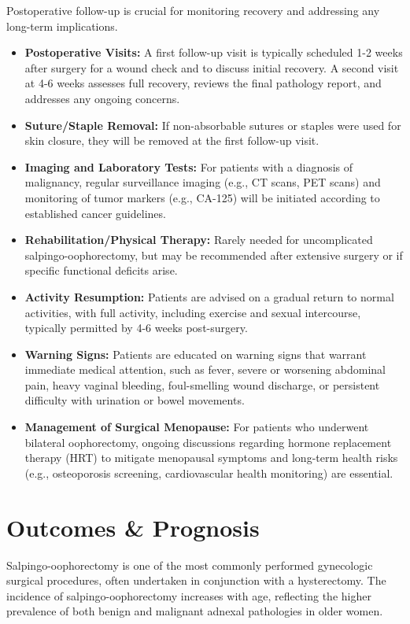 Postoperative follow-up is crucial for monitoring recovery and addressing any long-term implications. 

\begin{itemize}
  \item \textbf{Postoperative Visits:} A first follow-up visit is typically scheduled 1-2 weeks after surgery for a wound check and to discuss initial recovery. A second visit at 4-6 weeks assesses full recovery, reviews the final pathology report, and addresses any ongoing concerns.
  \item \textbf{Suture/Staple Removal:} If non-absorbable sutures or staples were used for skin closure, they will be removed at the first follow-up visit.
  \item \textbf{Imaging and Laboratory Tests:} For patients with a diagnosis of malignancy, regular surveillance imaging (e.g., CT scans, PET scans) and monitoring of tumor markers (e.g., CA-125) will be initiated according to established cancer guidelines.
  \item \textbf{Rehabilitation/Physical Therapy:} Rarely needed for uncomplicated salpingo-oophorectomy, but may be recommended after extensive surgery or if specific functional deficits arise.
  \item \textbf{Activity Resumption:} Patients are advised on a gradual return to normal activities, with full activity, including exercise and sexual intercourse, typically permitted by 4-6 weeks post-surgery.
  \item \textbf{Warning Signs:} Patients are educated on warning signs that warrant immediate medical attention, such as fever, severe or worsening abdominal pain, heavy vaginal bleeding, foul-smelling wound discharge, or persistent difficulty with urination or bowel movements.
  \item \textbf{Management of Surgical Menopause:} For patients who underwent bilateral oophorectomy, ongoing discussions regarding hormone replacement therapy (HRT) to mitigate menopausal symptoms and long-term health risks (e.g., osteoporosis screening, cardiovascular health monitoring) are essential.
\end{itemize}

\section*{Outcomes \& Prognosis}
Salpingo-oophorectomy is one of the most commonly performed gynecologic surgical procedures, often undertaken in conjunction with a hysterectomy. The incidence of salpingo-oophorectomy increases with age, reflecting the higher prevalence of both benign and malignant adnexal pathologies in older women. 

